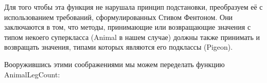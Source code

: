 \documentclass[a4paper]{article}
\begin{document}
\begin{figure}[h]
\end{figure}


Для того чтобы эта функция не нарушала принцип подстановки, преобразуем её с использованием требований, сформулированных Стивом Фентоном. Они заключаются в том, что методы, принимающие или возвращающие значения с типом некоего суперкласса (Animal в нашем случае) должны также принимать и возвращать значения, типами которых являются его подклассы (Pigeon).

Вооружившись этими соображениями мы можем переделать функцию AnimalLegCount:

\begin{figure}[h]
\end{figure}
\end{document}
